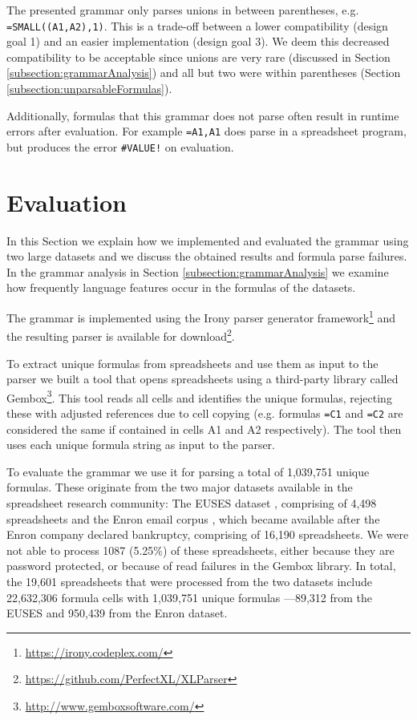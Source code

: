 \documentclass[conference]{IEEEtran}
\begin{document}
The presented grammar only parses unions in between parentheses, e.g. \texttt{=SMALL((A1,A2),1)}.
This is a trade-off between a lower compatibility (design goal 1) and an easier implementation (design goal 3).
We deem this decreased compatibility to be acceptable since unions are very rare (discussed in Section \ref{subsection:grammarAnalysis}) and all but two were within parentheses (Section \ref{subsection:unparsableFormulas}).

Additionally, formulas that this grammar does not parse often result in runtime errors after evaluation.
For example \texttt{=A1,A1} does parse in a spreadsheet program, but produces the error \texttt{\#VALUE!} on evaluation.

\section{Evaluation}
\label{sec:evaluation}

In this Section we explain how we implemented and evaluated the grammar using two large datasets and we discuss the obtained results and formula parse failures. In the grammar analysis in Section \ref{subsection:grammarAnalysis} we examine how frequently language features occur in the formulas of the datasets.

The grammar is implemented using the Irony parser generator framework\footnote{\url{https://irony.codeplex.com/}} and the resulting parser is available for download\footnote{\url{https://github.com/PerfectXL/XLParser}}.

To extract unique formulas from spreadsheets and use them as input to the parser we built a tool that opens spreadsheets using a third-party library called Gembox\footnote{\url{http://www.gemboxsoftware.com/}}. This tool reads all cells and identifies the unique formulas, rejecting these with adjusted references due to cell copying (e.g. formulas \texttt{=C1} and \texttt{=C2} are considered the same if contained in cells A1 and A2 respectively). The tool then uses each unique formula string as input to the parser.

To evaluate the grammar we use it for parsing a total of 1,039,751 unique formulas. These originate from the two major datasets available in the spreadsheet research community: The EUSES dataset \cite{euses}, comprising of 4,498 spreadsheets and the Enron email corpus \cite{enron}, which became available after the Enron company declared bankruptcy, comprising of 16,190 spreadsheets. We were not able to process 1087 (5.25\%) of these spreadsheets, either because they are password protected, or because of read failures in the Gembox library. In total, the 19,601 spreadsheets that were processed from the two datasets include 22,632,306 formula cells with 1,039,751 unique formulas ---89,312 from the EUSES and 950,439 from the Enron dataset.
\end{document}
